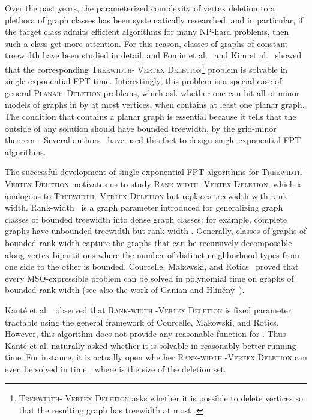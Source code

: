\documentclass[11pt]{elsarticle}
\begin{document}
Over the past years, the parameterized complexity of vertex deletion to a plethora of graph classes has been systematically researched, 
and in particular, if the target class admits efficient algorithms for many NP-hard problems, then such a class get more attention.
For this reason, classes of graphs of constant treewidth have been studied in detail, 
and Fomin et al.~\cite{FominLMS12} and Kim et al.~\cite{KLPRRSS13} showed that the corresponding \textsc{Treewidth- Vertex Deletion}\footnote{\textsc{Treewidth- Vertex Deletion} asks whether it is possible to delete  vertices so that the resulting graph has treewidth at most .}
problem is solvable in single-exponential FPT time.
Interestingly, this problem is a special case of general \textsc{Planar -Deletion} problems, which ask whether one can hit all of minor models of graphs in  by at most  vertices, when  contains at least one planar graph. 
The condition that  contains a planar graph is essential because it tells that the outside of any solution should have bounded treewidth, by the grid-minor theorem~\cite{RobertsonS1986}.
Several authors~\cite{FominLMS12,KLPRRSS13} have used this fact to design single-exponential FPT algorithms.

The successful development of single-exponential FPT algorithms for \textsc{Treewidth- Vertex Deletion} motivates us to study \textsc{Rank-width -Vertex Deletion}, which is analogous to \textsc{Treewidth- Vertex Deletion} but replaces treewidth with rank-width.
Rank-width~\cite{OS2004, Oum05} is a graph parameter introduced for generalizing graph classes of bounded treewidth into dense graph classes; for example,
complete graphs have unbounded treewidth but rank-width .
Generally, classes of graphs of bounded rank-width capture the graphs that can be recursively decomposable along vertex bipartitions  where the number of distinct neighborhood types from one side to the other is bounded. 
Courcelle, Makowski, and Rotics~\cite{CourcelleMR2000} proved that every MSO-expressible problem can be solved in
polynomial time on graphs of bounded rank-width (see also the work of Ganian and Hlin\v en\' y~\cite{GanianH10}).

Kant\'e et al.~\cite{KanteKKP2015} observed that \textsc{Rank-width -Vertex Deletion} is fixed parameter tractable using the general framework of Courcelle, Makowski, and Rotics.
However, this algorithm does not provide any reasonable function for . Thus Kant\'e et al. naturally asked whether it is solvable in reasonably better running time.
For instance, it is actually open whether \textsc{Rank-width -Vertex Deletion} can even be solved in time , where  is the size of the deletion set.
\end{document}
